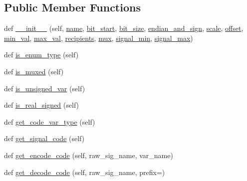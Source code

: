 \subsection*{Public Member Functions}
\begin{DoxyCompactItemize}
\item 
def \hyperlink{classdbc__parse_1_1Signal_a1d268fdf0b571e4494416e9f5b1dd1db}{\+\_\+\+\_\+init\+\_\+\+\_\+} (self, \hyperlink{classdbc__parse_1_1Signal_ab538298f120c1436a0395cefdd7c91c0}{name}, \hyperlink{classdbc__parse_1_1Signal_a70babd17847e0a22db23a285c7b7bdd4}{bit\+\_\+start}, \hyperlink{classdbc__parse_1_1Signal_a4ba14a3a4587f26f7f8d039865ced44d}{bit\+\_\+size}, \hyperlink{classdbc__parse_1_1Signal_a75d62e0bbc10f9682109ec1defebd5ee}{endian\+\_\+and\+\_\+sign}, \hyperlink{classdbc__parse_1_1Signal_aff0d2616f41078194641bce53785f2cb}{scale}, \hyperlink{classdbc__parse_1_1Signal_af698c461bf08c328b95087f7dec8ca4a}{offset}, \hyperlink{classdbc__parse_1_1Signal_a487fdfe59aaa5c9e835d84f7e91901d9}{min\+\_\+val}, \hyperlink{classdbc__parse_1_1Signal_a473c01c5af2e2c600d3d17d8cb06a64b}{max\+\_\+val}, \hyperlink{classdbc__parse_1_1Signal_ad200d8c7d21a2943c55a5b616443fced}{recipients}, \hyperlink{classdbc__parse_1_1Signal_a8f61273cc5f0f6403fc060755bb673f8}{mux}, \hyperlink{classdbc__parse_1_1Signal_a87563549f85b5c452c52c18d2475dc0f}{signal\+\_\+min}, \hyperlink{classdbc__parse_1_1Signal_a82b53a33dbba539f6ad99e9f17c8f87b}{signal\+\_\+max})
\item 
def \hyperlink{classdbc__parse_1_1Signal_a4fbc1ed9537e96ef3588e0892724b351}{is\+\_\+enum\+\_\+type} (self)
\item 
def \hyperlink{classdbc__parse_1_1Signal_a6f9515bbd917e6c2af97cc648abf5ad8}{is\+\_\+muxed} (self)
\item 
def \hyperlink{classdbc__parse_1_1Signal_ac7fe657a88834d3ae3183c0bb7535ea5}{is\+\_\+unsigned\+\_\+var} (self)
\item 
def \hyperlink{classdbc__parse_1_1Signal_a2674b37c8e0366f6901ea05c2a85f2f5}{is\+\_\+real\+\_\+signed} (self)
\item 
def \hyperlink{classdbc__parse_1_1Signal_a12882d9b75ea5d6a04bb0a71b052529f}{get\+\_\+code\+\_\+var\+\_\+type} (self)
\item 
def \hyperlink{classdbc__parse_1_1Signal_a8cfcebacf6784cb2e2f31997a6e822fc}{get\+\_\+signal\+\_\+code} (self)
\item 
def \hyperlink{classdbc__parse_1_1Signal_aeaf710df52b982e59df7f61542a685af}{get\+\_\+encode\+\_\+code} (self, raw\+\_\+sig\+\_\+name, var\+\_\+name)
\item 
def \hyperlink{classdbc__parse_1_1Signal_a0acc084f4b8637ebe0690b06db5fbcf0}{get\+\_\+decode\+\_\+code} (self, raw\+\_\+sig\+\_\+name, prefix=\textquotesingle{}\textquotesingle{})
\end{DoxyCompactItemize}

